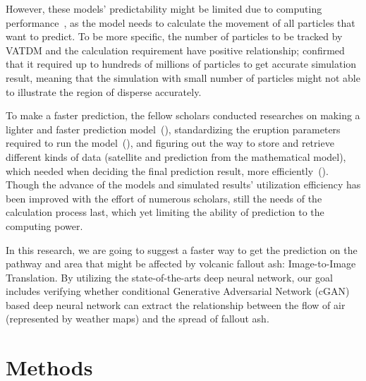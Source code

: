 \documentclass{article}
\begin{document}
\begin{doublespacing}
{  However, these models’ predictability might be limited due to computing 
  performance~\citep[p.745-746]{Tanaka2022}, as the model needs to calculate the movement of all 
  particles that want to predict. To be more specific, the number of particles to be tracked by 
  VATDM and the calculation requirement have positive relationship; \citet{SCOLLO2011129} confirmed 
  that it required up to hundreds of millions of particles to get accurate simulation result, 
  meaning that the simulation with small number of particles might not able to illustrate the 
  region of disperse accurately.

  To make a faster prediction, the fellow scholars conducted researches on making a lighter and 
  faster prediction model~(\citet{Searcy1998}), standardizing the eruption parameters required to 
  run the model~(\citet[p.7]{Webley2009}), and figuring out the way to store and retrieve different 
  kinds of data (satellite and prediction from the mathematical model), which needed when deciding 
  the final prediction result, more efficiently~(\citet{Sorokin2016}). Though the advance of the 
  models and simulated results' utilization efficiency has been improved with the effort of numerous
  scholars, still the needs of the calculation process last, which yet limiting the ability of 
  prediction to the computing power.

  In this research, we are going to suggest a faster way to get the prediction on the pathway and 
  area that might be affected by volcanic fallout ash: Image-to-Image Translation. By utilizing the
  state-of-the-arts deep neural network, our goal includes verifying whether conditional Generative 
  Adversarial Network (cGAN) based deep neural network can extract the relationship between the flow
  of air (represented by weather maps) and the spread of fallout ash.
}

\section{Methods}  %
\fontsize{11pt}{11pt} 
\end{doublespacing}
\end{document}
